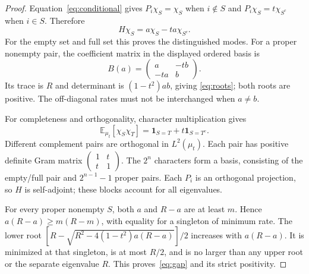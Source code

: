 \documentclass[11pt]{article}
\newcommand{\E}{\mathbb E}
\newcommand{\one}{\mathbf 1}
\begin{document}
\begin{proof}
Equation~\eqref{eq:conditional} gives $P_i\chi_S=\chi_S$ when
$i\notin S$ and $P_i\chi_S=t\chi_{S^c}$ when $i\in S$.
Therefore
\begin{equation}\label{eq:action}
 H\chi_S=a\chi_S-ta\chi_{S^c}.
\end{equation}
For the empty set and full set this proves the distinguished modes.
For a proper nonempty pair, the coefficient matrix in the displayed
ordered basis is
\begin{equation}\label{eq:block}
 B(a)=\begin{pmatrix}a&-tb\\-ta&b\end{pmatrix}.
\end{equation}
Its trace is $R$ and determinant is $(1-t^2)ab$, giving
\eqref{eq:roots}; both roots are positive. The off-diagonal rates
must not be interchanged when $a\ne b$.

For completeness and orthogonality, character multiplication gives
\begin{equation}\label{eq:gram}
 \E_{\mu_t}[\chi_S\chi_T]
 =\one_{S=T}+t\one_{S=T^c}.
\end{equation}
Different complement pairs are orthogonal in $L^2(\mu_t)$.
Each pair has positive definite Gram matrix
$\left(\begin{smallmatrix}1&t\\t&1\end{smallmatrix}\right)$.
The $2^n$ characters form a basis, consisting of the empty/full pair
and $2^{n-1}-1$ proper pairs. Each $P_i$ is an orthogonal projection,
so $H$ is self-adjoint; these blocks account for all eigenvalues.

For every proper nonempty $S$, both $a$ and $R-a$ are at least $m$.
Hence $a(R-a)\ge m(R-m)$, with equality for a singleton of minimum
rate. The lower root
$[R-\sqrt{R^2-4(1-t^2)a(R-a)}]/2$ increases with $a(R-a)$.
It is minimized at that singleton, is at most $R/2$, and is no
larger than any upper root or the separate eigenvalue $R$.
This proves~\eqref{eq:gap} and its strict positivity.
\end{proof}
\end{document}
